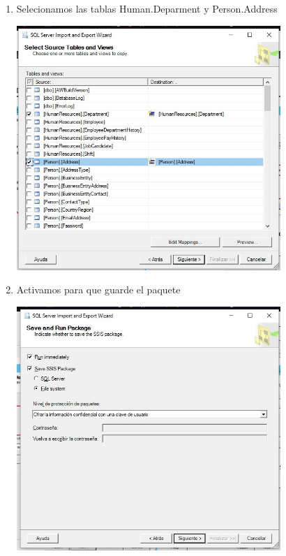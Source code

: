 \begin{enumerate}
     \item Selecionamos las tablas Human.Deparment y Person.Address
        \begin{center}
             \includegraphics[width=10cm]{imagenes/importa_data_5.jpg}
        \end{center}
        
     \item Activamos para que guarde el paquete
        \begin{center}
             \includegraphics[width=10cm]{imagenes/importa_data_6.jpg}
        \end{center}
        \newpage
        

\end{enumerate}
